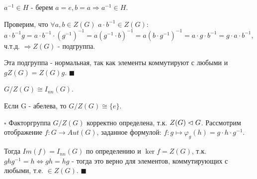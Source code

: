 \documentclass[../main.tex]{subfiles}
\begin{document}
 $a^{-1}\in H$ - берем $a = e, b = a \Longrightarrow a^{-1}\in H$.

Проверим, что $\forall a, b\in Z(G)$ $a\cdot b^{-1}\in Z(G)$: $a\cdot b^{-1}g = a\cdot b^{-1}\cdot(g^{-1})^{-1} =
a(g^{-1}\cdot b)^{-1} = a(b\cdot g^{-1})^{-1} = a\cdot g\cdot b^{-1} = g\cdot a\cdot b^{-1}$, ч.т.д.
$\Longrightarrow Z(G)$ - подгруппа.

Эта подгруппа - нормальная, так как элементы коммутируют с любыми и $gZ(G) = Z(G)g$. $\blacksquare$

\void{} $G/Z(G) \cong I_{nn}(G)$.

\void{} Если G - абелева, то $G/Z(G) \cong \{e\}$.

\void
$\square$ Факторгруппа $G/Z(G)$ корректно определена, т.к. $Z(G)\vartriangleleft G$.
Рассмотрим отображение $f: G\rightarrow Aut(G)$, заданное формулой:
$f: g\mapsto \varphi_g(h) = g\cdot h\cdot g^{-1}$.

Тогда $Im(f) = I_{nn}(G)$ по определению и $\ker{f} = Z(G)$, т.к. $ghg^{-1} = h \Longleftrightarrow
gh = hg$ - тогда это верно для элементов, коммутирующих с любыми, т.е. $\in Z(G)$. $\blacksquare$
\end{document}
